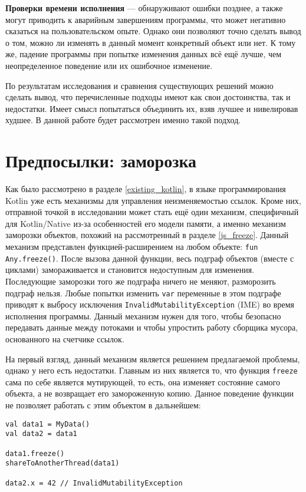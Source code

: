 \documentclass[specification,annotation,times]{itmo-student-thesis}
\begin{document}
\textbf{Проверки времени исполнения} --- обнаруживают ошибки позднее, а также могут приводить к аварийным завершениям программы, что может негативно сказаться на пользовательском опыте.
Однако они позволяют точно сделать вывод о том, можно ли изменять в данный момент конкретный объект или нет.
К тому же, падение программы при попытке изменения данных всё ещё лучше, чем неопределенное поведение или их ошибочное изменение.  

По результатам исследования и сравнения существующих решений можно сделать вывод, что перечисленные подходы имеют как свои достоинства, так и недостатки.
Имеет смысл попытаться объединить их, взяв лучшее и нивелировав худшее. В данной работе будет рассмотрен именно такой подход.


\section{Предпосылки: заморозка}

Как было рассмотрено в разделе \ref{existing_kotlin}, в языке программирования Kotlin уже есть механизмы для управления неизменяемостью ссылок.
Кроме них, отправной точкой в исследовании может стать ещё один механизм, специфичный для Kotlin/Native из-за особенностей его модели памяти, а именно механизм заморозки объектов, похожий на рассмотренный в разделе \ref{js_freeze}.
Данный механизм представлен функцией-расширением на любом объекте: \texttt{fun Any.freeze()}.
После вызова данной функции, весь подграф объектов (вместе с циклами) замораживается и становится недоступным для изменения. Последующие заморозки того же подграфа ничего не меняют, разморозить подграф нельзя.
Любые попытки изменить \texttt{var} переменные в этом подграфе приводят к выбросу исключения \texttt{InvalidMutabilityException} (IME) во время исполнения программы.
Данный механизм нужен для того, чтобы безопасно передавать данные между потоками и чтобы упростить работу сборщика мусора, основанного на счетчике ссылок.

На первый взгляд, данный механизм является решением предлагаемой проблемы, однако у него есть недостатки.
Главным из них является то, что функция \texttt{freeze} сама по себе является мутирующей, то есть, она изменяет состояние самого объекта, а не возвращает его замороженную копию.
Данное поведение функции не позволяет работать с этим объектом в дальнейшем:

\begin{lstlisting}[caption={Заморозка изначального объекта}]
val data1 = MyData()
val data2 = data1

data1.freeze()
shareToAnotherThread(data1)

data2.x = 42 // InvalidMutabilityException
\end{lstlisting}
\end{document}
